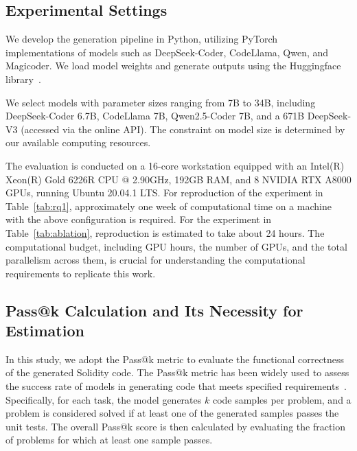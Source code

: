 \subsection{Experimental Settings}

We develop the generation pipeline in Python, utilizing PyTorch~\cite{paszke2019pytorch} implementations of models such as DeepSeek-Coder, CodeLlama, Qwen, and Magicoder. We load model weights and generate outputs using the Huggingface library~\cite{huggingface}. 

We select models with parameter sizes ranging from 7B to 34B, including DeepSeek-Coder 6.7B, CodeLlama 7B, Qwen2.5-Coder 7B, and a 671B DeepSeek-V3 (accessed via the online API). The constraint on model size is determined by our available computing resources. 

The evaluation is conducted on a 16-core workstation equipped with an Intel(R) Xeon(R) Gold 6226R CPU @ 2.90GHz, 192GB RAM, and 8 NVIDIA RTX A8000 GPUs, running Ubuntu 20.04.1 LTS. For reproduction of the experiment in Table~\ref{tab:rq1}, approximately one week of computational time on a machine with the above configuration is required. For the experiment in Table~\ref{tab:ablation}, reproduction is estimated to take about 24 hours. The computational budget, including GPU hours, the number of GPUs, and the total parallelism across them, is crucial for understanding the computational requirements to replicate this work.



\subsection{Pass@k Calculation and Its Necessity for Estimation}
\label{sec:passk}

In this study, we adopt the Pass@k metric to evaluate the functional correctness of the generated Solidity code. The Pass@k metric has been widely used to assess the success rate of models in generating code that meets specified requirements~\cite{chen2021evaluating,yu2024codereval,benchmark2024sol}. Specifically, for each task, the model generates \( k \) code samples per problem, and a problem is considered solved if at least one of the generated samples passes the unit tests. The overall Pass@k score is then calculated by evaluating the fraction of problems for which at least one sample passes.

